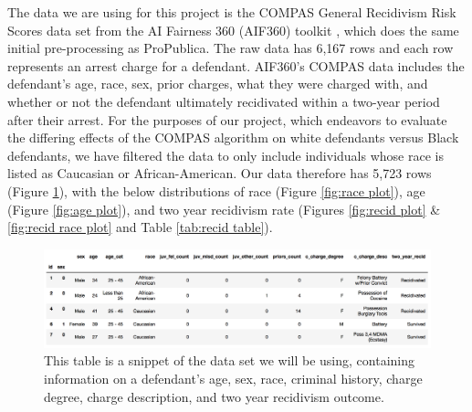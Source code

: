 \documentclass[water,article,submit,moreauthors,pdftex]{mdpi}
\begin{document}
The data we are using for this project is the COMPAS General Recidivism
Risk Scores data set from the AI Fairness 360 (AIF360) toolkit
\citep{aif360-oct-2018}, which does the same initial pre-processing as
ProPublica. The raw data has 6,167 rows and each row represents an
arrest charge for a defendant. AIF360's COMPAS data includes the
defendant's age, race, sex, prior charges, what they were charged with,
and whether or not the defendant ultimately recidivated within a
two-year period after their arrest. For the purposes of our project,
which endeavors to evaluate the differing effects of the COMPAS
algorithm on white defendants versus Black defendants, we have filtered
the data to only include individuals whose race is listed as Caucasian
or African-American. Our data therefore has 5,723 rows (Figure
\ref{fig:table snip}), with the below distributions of race (Figure
\ref{fig:race plot}), age (Figure \ref{fig:age plot}), and two year
recidivism rate (Figures \ref{fig:recid plot} \&
\ref{fig:recid race plot} and Table \ref{tab:recid table}).

\begin{figure}

{\centering \includegraphics[width=1\linewidth]{../images/table_snippet}

}

\caption{This table is a snippet of the data set we will be using, containing information on a defendant's age, sex, race, criminal history, charge degree, charge description, and two year recidivism outcome.}\label{fig:table snip}
\end{figure}
\end{document}
